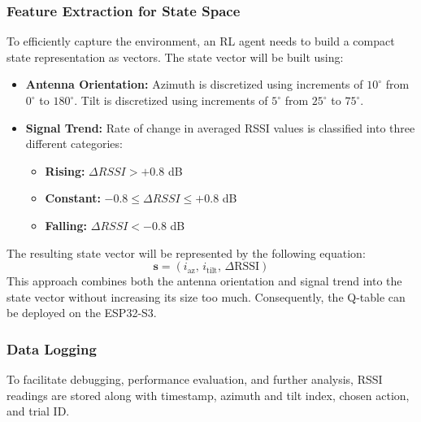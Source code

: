 \subsubsection{Feature Extraction for State Space}

To efficiently capture the environment, an RL agent needs to build a compact state
representation as vectors. The state vector will be built using:
\begin{itemize}
    \item \textbf{Antenna Orientation:} Azimuth is discretized using increments of
    $10^{\circ}$ from $0^{\circ}$ to $180^{\circ}$. Tilt is discretized using increments
    of $5^{\circ}$ from $25^{\circ}$ to $75^{\circ}$.
    \item \textbf{Signal Trend:} Rate of change in averaged RSSI values is classified
    into three different categories:
        \begin{itemize}
            \item \textbf{Rising:} $\Delta RSSI > +0.8$ dB
            \item \textbf{Constant:} $-0.8 \leq \Delta RSSI \leq +0.8$ dB
            \item \textbf{Falling:} $\Delta RSSI < -0.8$ dB
        \end{itemize}
\end{itemize}

The resulting state vector will be represented by the following equation:
\begin{equation}
\mathbf{s} = \left( i_{\text{az}},\, i_{\text{tilt}},\, \Delta \mathrm{RSSI} \right)
\label{eq:state_vector}
\end{equation}
This approach combines both the antenna orientation and signal trend into the state
vector without increasing its size too much. Consequently, the Q-table can be deployed
on the ESP32-S3.

\subsubsection{Data Logging}

To facilitate debugging, performance evaluation, and further analysis, RSSI readings are
stored along with timestamp, azimuth and tilt index, chosen action, and trial ID.